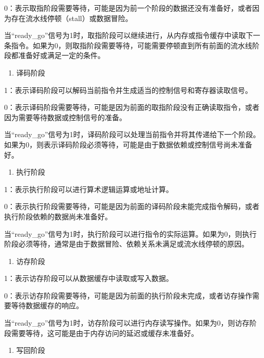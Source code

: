 0：表示取指阶段需要等待，可能是因为前一个阶段的数据还没有准备好，或者因为存在流水线停顿（stall）或数据冒险。

当``ready\_go''信号为1时，取指阶段可以继续进行，从内存或指令缓存中读取下一条指令。如果为0，则取指阶段需要等待，可能需要停顿直到所有前面的流水线阶段都准备好或满足一定的条件。

\begin{enumerate}
\def\labelenumi{\arabic{enumi}.}
\setcounter{enumi}{1}
\tightlist
\item
  译码阶段
\end{enumerate}

1：表示译码阶段可以解码当前指令并生成适当的控制信号和寄存器读取信号。

0：表示译码阶段需要等待，可能是因为前面的取指阶段没有正确读取指令，或者因为需要等待数据或控制信号的准备。

当``ready\_go''信号为1时，译码阶段可以处理当前指令并将其传递给下一个阶段。如果为0，则表示译码阶段必须等待，可能是由于数据依赖或控制信号尚未准备好。

\begin{enumerate}
\def\labelenumi{\arabic{enumi}.}
\setcounter{enumi}{2}
\tightlist
\item
  执行阶段
\end{enumerate}

1：表示执行阶段可以进行算术逻辑运算或地址计算。

0：表示执行阶段需要等待，可能是因为前面的译码阶段未能完成指令解码，或者执行阶段依赖的数据尚未准备好。

当``ready\_go''信号为1时，执行阶段可以进行指令的实际运算。如果为0，则执行阶段必须等待，通常是由于数据冒险、依赖关系未满足或流水线停顿的原因。

\begin{enumerate}
\def\labelenumi{\arabic{enumi}.}
\setcounter{enumi}{3}
\tightlist
\item
  访存阶段
\end{enumerate}

1：表示访存阶段可以从数据缓存中读取或写入数据。

0：表示访存阶段需要等待，可能是因为前面的执行阶段未完成，或者访存操作需要等待数据缓存的响应。

当``ready\_go''信号为1时，访存阶段可以进行内存读写操作。如果为0，则访存阶段需要等待，这可能是由于内存访问的延迟或缓存未准备好。

\begin{enumerate}
\def\labelenumi{\arabic{enumi}.}
\setcounter{enumi}{4}
\tightlist
\item
  写回阶段
\end{enumerate}

